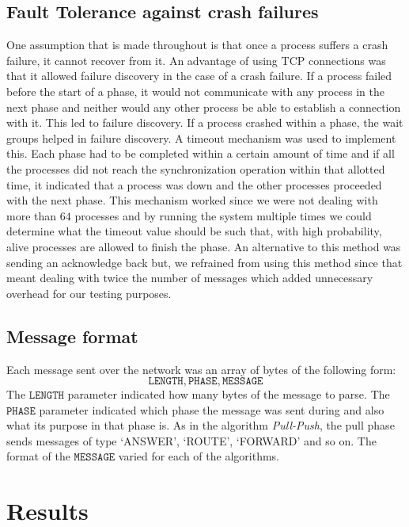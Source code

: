 \subsection{Fault Tolerance against crash failures}
One assumption that is made throughout is that once a process suffers a crash failure, it cannot recover from it. An advantage of using TCP connections was that it allowed failure discovery in the case of a crash failure. If a process failed before the start of a phase, it would not communicate with any process in the next phase and neither would any other process be able to establish a connection with it. This led to failure discovery. If a process crashed within a phase, the wait groups helped in failure discovery. A timeout mechanism was used to implement this. Each phase had to be completed within a certain amount of time and if all the processes did not reach the synchronization operation within that allotted time, it indicated that a process was down and the other processes proceeded with the next phase. This mechanism worked since we were not dealing with more than $64$ processes and by running the system multiple times we could determine what the timeout value should be such that, with high probability, alive processes are allowed to finish the phase. An alternative to this method was sending an acknowledge back but, we refrained from using this method since that meant dealing with twice the number of messages which added unnecessary overhead for our testing purposes. 

\subsection{Message format}
Each message sent over the network was an array of bytes of the following form:
\begin{equation*}
    \mathtt{LENGTH}, \mathtt{PHASE}, \mathtt{MESSAGE}
\end{equation*}
The $\mathtt{LENGTH}$ parameter indicated how many bytes of the message to parse. The $\mathtt{PHASE}$ parameter indicated which phase the message was sent during and also what its purpose in that phase is. As in the algorithm \textit{Pull-Push}, the pull phase sends messages of type `ANSWER', `ROUTE', `FORWARD' and so on. The format of the $\mathtt{MESSAGE}$ varied for each of the algorithms.


\section{Results}
\label{sec:results}

